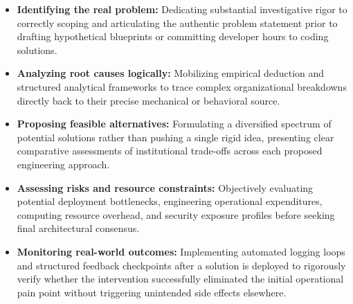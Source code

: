 \begin{itemize}
\tightlist
\item
  \textbf{Identifying the real problem:} Dedicating substantial
  investigative rigor to correctly scoping and articulating the
  authentic problem statement prior to drafting hypothetical blueprints
  or committing developer hours to coding solutions.
\item
  \textbf{Analyzing root causes logically:} Mobilizing empirical
  deduction and structured analytical frameworks to trace complex
  organizational breakdowns directly back to their precise mechanical or
  behavioral source.
\item
  \textbf{Proposing feasible alternatives:} Formulating a diversified
  spectrum of potential solutions rather than pushing a single rigid
  idea, presenting clear comparative assessments of institutional
  trade-offs across each proposed engineering approach.
\item
  \textbf{Assessing risks and resource constraints:} Objectively
  evaluating potential deployment bottlenecks, engineering operational
  expenditures, computing resource overhead, and security exposure
  profiles before seeking final architectural consensus.
\item
  \textbf{Monitoring real-world outcomes:} Implementing automated
  logging loops and structured feedback checkpoints after a solution is
  deployed to rigorously verify whether the intervention successfully
  eliminated the initial operational pain point without triggering
  unintended side effects elsewhere.
\end{itemize}

